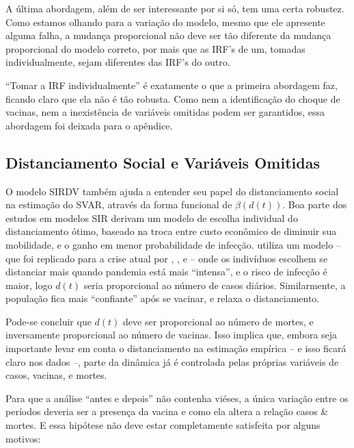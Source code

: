 \documentclass[
    article,
	12pt,				%
	oneside,			%
	a4paper,			%
	english,			%
	brazil,				%
	hyperref = {colorlinks, citecolor=c1d, linkcolor=c2d, urlcolor=c3d, colorlinks}
	]{abntex2}
\newcounter{j}
\begin{document}
A última abordagem, além de ser interessante por si só, tem uma certa robustez. Como estamos olhando para a variação do modelo, mesmo que ele apresente alguma falha, a mudança proporcional não deve ser tão diferente da mudança proporcional do modelo correto, por mais que as IRF's de um, tomadas individualmente, sejam diferentes das IRF's do outro.

``Tomar a IRF individualmente'' é exatamente o que a primeira abordagem faz, ficando claro que ela não é tão robusta. Como nem a identificação do choque de vacinas, nem a inexistência de variáveis omitidas podem ser garantidos, essa abordagem foi deixada para o apêndice.


\subsection{Distanciamento Social e Variáveis Omitidas}

O modelo SIRDV também ajuda a entender seu papel do distanciamento social na estimação do SVAR, através da forma funcional de $\beta(d(t))$. Boa parte dos estudos em modelos SIR derivam um modelo de escolha individual do distanciamento ótimo, baseado na troca entre custo econômico de diminuir sua mobilidade, e o ganho em menor probabilidade de infecção. \textcite{Reluga2010} utiliza um modelo -- que foi replicado para a crise atual por \textcite{Cabrera2021}, \textcite{Mwalili2020}, e \textcite{Baker2020} -- onde os indivíduos escolhem se distanciar mais quando pandemia está mais ``intensa'', e o risco de infecção é maior, logo $d(t)$ seria proporcional ao número de casos diários. Similarmente, a população fica mais ``confiante'' após se vacinar, e relaxa o distanciamento.

Pode-se concluir que $d(t)$ deve ser proporcional ao número de mortes, e inversamente proporcional ao número de vacinas. Isso implica que, embora seja importante levar em conta o distanciamento na estimação empírica -- e isso ficará claro nos dados --, parte da dinâmica já é controlada pelas próprias variáveis de casos, vacinas, e mortes.

Para que a análise ``antes e depois'' não contenha viéses, a única variação entre os períodos deveria ser a presença da vacina e como ela altera a relação casos \& mortes. E essa hipótese não deve estar completamente satisfeita por alguns motivos:
\end{document}
